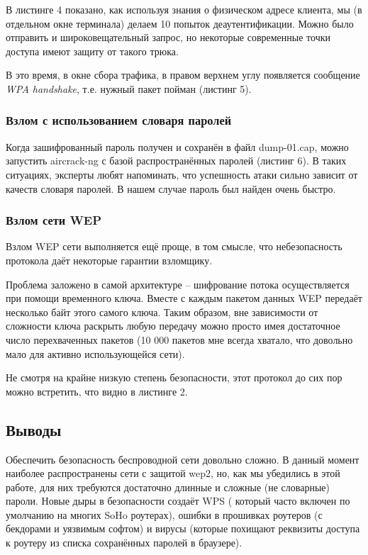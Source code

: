 \documentclass[a4paper, 12pt]{article}		%
\begin{document}
В листинге 4 показано, как используя знания о физическом адресе клиента, мы (в отдельном окне терминала) делаем 10 попыток деаутентификации. Можно было отправить и широковещательный запрос, но некоторые современные точки доступа имеют защиту от такого трюка.



В это время, в окне сбора трафика, в правом верхнем углу появляется сообщение \textit{WPA handshake}, т.е. нужный пакет пойман (листинг 5).




\subsubsection{Взлом с использованием словаря паролей}

Когда зашифрованный пароль получен и сохранён в файл dump-01.cap, можно запустить aircrack-ng с базой распространённых паролей (листинг 6). В таких ситуациях, эксперты любят напоминать, что успешность атаки сильно зависит от качеств словаря паролей.
В нашем случае пароль был найден очень быстро.



\subsubsection{Взлом сети WEP}

Взлом WEP сети выполняется ещё проще, в том смысле, что небезопасность протокола даёт некоторые гарантии взломщику. 

Проблема заложено в самой архитектуре -- шифрование потока осуществляется при помощи временного ключа. Вместе с каждым пакетом данных  WEP передаёт несколько байт этого самого ключа. Таким образом, вне зависимости от сложности ключа раскрыть любую передачу можно просто имея достаточное число перехваченных пакетов (10 000 пакетов мне всегда хватало, что довольно мало для активно использующейся сети).

Не смотря на крайне низкую степень безопасности, этот протокол до сих пор можно встретить, что видно в листинге 2.

\newpage
\subsection{Выводы}

Обеспечить безопасность беспроводной сети довольно сложно. В данный момент наиболее распространены сети с защитой wep2, но, как мы убедились в этой работе, для них требуются достаточно длинные и сложные (не словарные) пароли. Новые дыры в безопасности создаёт WPS ( который часто включен по умолчанию на многих SoHo роутерах), ошибки в прошивках роутеров (с бекдорами и уязвимым софтом) и вирусы (которые похищают реквизиты доступа к роутеру из списка сохранённых паролей в браузере).

\end{document}
